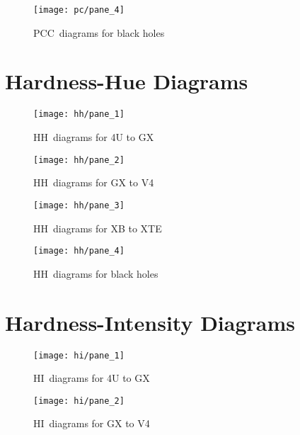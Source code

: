 \begin{figure}[p]
	{\vspace*{-0cm}\hspace*{-3cm}\texttt{[image: pc/pane\_4]}}
	\caption{\acs{PCC}~diagrams for black holes}\label{fig:pc_pane_4}
\end{figure}

\captionsetup[figure]{list=yes}
\chapter{Hardness-Hue Diagrams}
\label{ch:hhds}
\begin{figure}[p]
	{\vspace*{-0cm}\hspace*{-3cm}\texttt{[image: hh/pane\_1]}}
	\caption{\acs{HH}~diagrams for 4U to GX}\label{fig:hh_pane_1}
\end{figure}
\captionsetup[figure]{list=no}
\begin{figure}[p]
	{\vspace*{-0cm}\hspace*{-3cm}\texttt{[image: hh/pane\_2]}}
	\caption{\acs{HH}~diagrams for GX to V4}\label{fig:hh_pane_2}
\end{figure}

\begin{figure}[p]
	{\vspace*{-0cm}\hspace*{-3cm}\texttt{[image: hh/pane\_3]}}
	\caption{\acs{HH}~diagrams for XB to XTE}\label{fig:hh_pane_3}
\end{figure}

\begin{figure}[p]
	{\vspace*{-0cm}\hspace*{-3cm}\texttt{[image: hh/pane\_4]}}
	\caption{\acs{HH}~diagrams for black holes}\label{fig:hh_pane_4}
\end{figure}

\captionsetup[figure]{list=yes}
\chapter{Hardness-Intensity Diagrams}
\label{ch:hids}
\begin{figure}[p]
	{\vspace*{-0cm}\hspace*{-3cm}\texttt{[image: hi/pane\_1]}}
	\caption{\acs{HI}~diagrams for 4U to GX}\label{fig:hi_pane_1}
\end{figure}
\captionsetup[figure]{list=no}
\begin{figure}[p]
	{\vspace*{-0cm}\hspace*{-3cm}\texttt{[image: hi/pane\_2]}}
	\caption{\acs{HI}~diagrams for GX to V4}\label{fig:hi_pane_2}
\end{figure}

